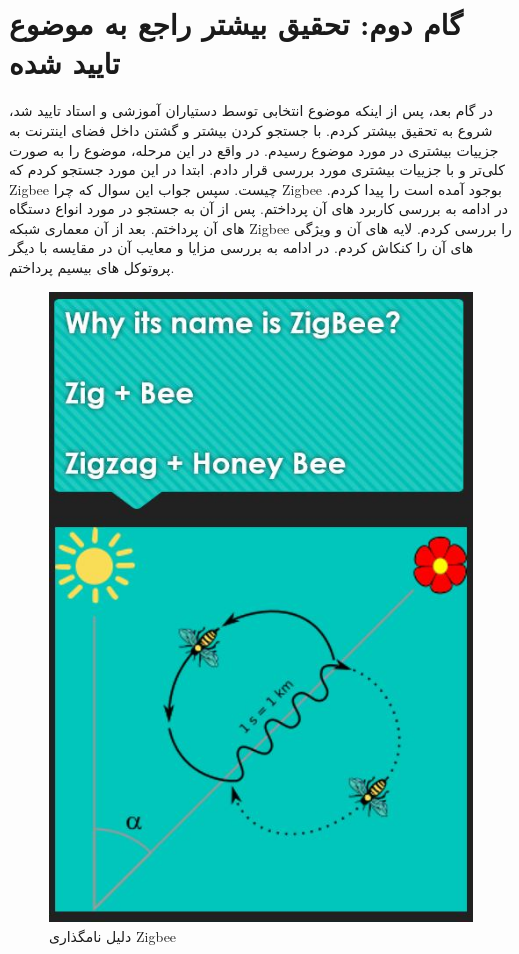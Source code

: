 \def \Subject {گام دوم: تحقیق بیشتر راجع به موضوع تایید شده}
\section{\Subject}
در گام بعد، پس از اینکه موضوع انتخابی توسط دستیاران آموزشی و استاد تایید شد، شروع به تحقیق بیشتر کردم.
با جستجو کردن بیشتر و گشتن داخل فضای اینترنت به جزییات بیشتری در مورد موضوع رسیدم.
در واقع
در این مرحله، موضوع را به صورت کلی‌تر و با جزییات بیشتری مورد بررسی قرار دادم.
ابتدا در این مورد جستجو کردم که 
Zigbee
چیست.
سپس جواب این سوال که چرا 
Zigbee 
بوجود آمده است را پیدا کردم.
در ادامه به بررسی کاربرد های آن پرداختم.
پس از آن به جستجو در مورد انواع دستگاه های آن پرداختم.
بعد از آن معماری شبکه 
Zigbee
را بررسی کردم.
لایه های آن و ویژگی های آن را کنکاش کردم.
در ادامه به بررسی مزایا و معایب آن در مقایسه با دیگر پروتوکل های بیسیم پرداختم.

\begin{figure}[H]
    \centering
    \includegraphics[width=0.65\linewidth]{images/name.JPG}
    \caption{ دلیل نامگذاری Zigbee }
    \label{fig:h}
\end{figure}
